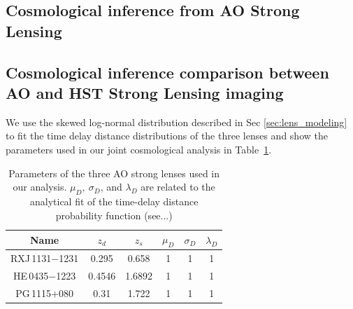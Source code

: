 \documentclass[useAMS,usenatbib]{mnras}
\newcommand\rxj{RXJ\,1131$-$1231}
\newcommand\he{HE\,0435$-$1223}
\newcommand\pg{PG\,1115$+$080}
\newcommand{\tref}[1]{Table~\ref{#1}}
\def\planck{\textit{planck}}
\begin{document}


\subsection{Cosmological inference from AO Strong Lensing}
\label{subsec:cosmoAO}
\subsection{Cosmological inference comparison between AO and HST Strong Lensing imaging}
We use the skewed log-normal distribution described in Sec \ref{sec:lens_modeling} to fit the time delay distance distributions of the three lenses and show the parameters used in our joint cosmological analysis in \tref{table:TDfitting}. 

\begin{table}
\centering
\caption{Parameters of the three AO strong lenses used in our analysis. $\mu_{D},~\sigma_{D}$, and $\lambda_{D}$ are related to the analytical fit of the time-delay distance probability function (see...)}
\label{table:TDfitting}
 \begin{tabular}{||c c c c c c||} 
 \hline
 Name & $z_{d}$ & $z_{s}$ & $\mu_{D}$ & $\sigma_{D}$ & $\lambda_{D}$\\ [0.2ex] 
 \hline\hline
 \rxj & 0.295 & 0.658 & 1&1&1 \\ 
 \hline
 \he & 0.4546 & 1.6892 & 1&1&1\\
 \hline
 \pg & 0.31 & 1.722 &  1&1&1\\
 \hline
 
 \end{tabular}

\end{table}
\end{document}
